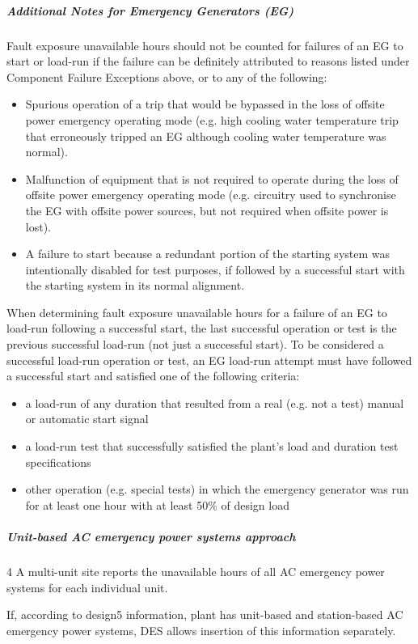 \subparagraph{Additional Notes for Emergency Generators (EG)}

Fault exposure unavailable hours should not be counted for failures of
an EG to start or load-run if the failure can be definitely attributed
to reasons listed under Component Failure Exceptions above, or to any
of the following:
\begin{itemize}
\item Spurious operation of a trip that would be bypassed in the loss of offsite power emergency operating mode (e.g. high cooling water temperature trip that erroneously tripped an EG although cooling water temperature was normal).
\item Malfunction of equipment that is not required to operate during the loss of offsite power emergency operating mode (e.g. circuitry used to synchronise the EG with offsite power sources, but not required when offsite power is lost).
\item A failure to start because a redundant portion of the starting
  system was intentionally disabled for test purposes, if followed by
  a successful start with the starting system in its normal alignment.
\end{itemize}

When determining fault exposure unavailable hours for a failure of an
EG to load-run following a successful start, the last successful
operation or test is the previous successful load-run (not just a
successful start). To be considered a successful load-run operation or
test, an EG load-run attempt must have followed a successful start and
satisfied one of the following criteria:
\begin{itemize}
\item a load-run of any duration that resulted from a real (e.g. not a test) manual or automatic start signal
\item a load-run test that successfully satisfied the plant's load and duration test specifications
\item other operation (e.g. special tests) in which the emergency
  generator was run for at least one hour with at least 50\% of design
  load
\end{itemize}

\subparagraph{Unit-based AC emergency power systems approach}4
A multi-unit site reports the unavailable hours of all AC emergency
power systems for each individual unit.

If, according to design5 information, plant has unit-based and
station-based AC emergency power systems, DES allows insertion of this
information separately.

